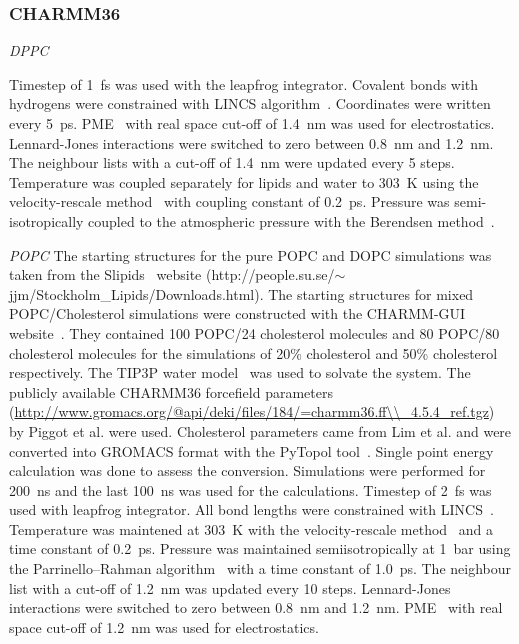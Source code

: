 \documentclass[journal=jacsat,manuscript=article]{achemso}
\begin{document}
\subsubsection{CHARMM36}

{\it DPPC}

Timestep of 1~fs was used with the leapfrog integrator. Covalent bonds with hydrogens were constrained with LINCS algorithm~\cite{hess97,hess07}. 
Coordinates were written every 5~ps. PME~\cite{darden93,essman95} with real space cut-off of 1.4~nm was used 
for electrostatics. Lennard-Jones interactions were switched to zero between 0.8~nm and 1.2~nm.
The neighbour lists with a cut-off of 1.4~nm were updated every 5 steps. Temperature was coupled separately
for lipids and water to 303~K using the velocity-rescale method~\cite{bussi07} with coupling constant of 0.2~ps.
Pressure was semi-isotropically coupled to the atmospheric pressure with the Berendsen method~\cite{berendsen84}.

{\it POPC}
The starting structures for the pure POPC and DOPC simulations was taken from the Slipids~\cite{jambeck12b} website (http://people.su.se/$\sim$jjm/Stockholm\_Lipids/Downloads.html).
The starting structures for mixed POPC/Cholesterol simulations were constructed with the CHARMM-GUI website~\cite{jo08}. 
They contained 100 POPC/24 cholesterol molecules and 80 POPC/80 cholesterol molecules for
the simulations of 20\% cholesterol and 50\% cholesterol respectively. The TIP3P water model~\cite{jorgensen83} was used to
solvate the system.
The publicly available CHARMM36 forcefield parameters (\url{http://www.gromacs.org/@api/deki/files/184/=charmm36.ff\\\_4.5.4\_ref.tgz}) 
by Piggot et al. \cite{piggot12} were used. Cholesterol parameters came
from Lim et al. \cite{lim12} and were converted into GROMACS format with the PyTopol tool~\cite{salari15}.  
Single point energy calculation was done to assess the conversion. 
Simulations were performed for 200~ns and the last 100~ns was used for the calculations. Timestep of 2~fs was
used with leapfrog integrator. All bond lengths were constrained with LINCS~\cite{hess97,hess07}. Temperature was maintened at
303~K with the velocity-rescale method~\cite{bussi07} and a time constant of 0.2~ps. Pressure was maintained semiisotropically
at 1~bar using the Parrinello--Rahman algorithm~\cite{parrinello81} with a time constant of 1.0~ps. The neighbour list with a cut-off of 1.2~nm
was updated every 10 steps. Lennard-Jones interactions were switched to zero
between 0.8~nm and 1.2~nm. PME~\cite{darden93,essman95} with real space cut-off of 1.2~nm was used for electrostatics.
\end{document}
